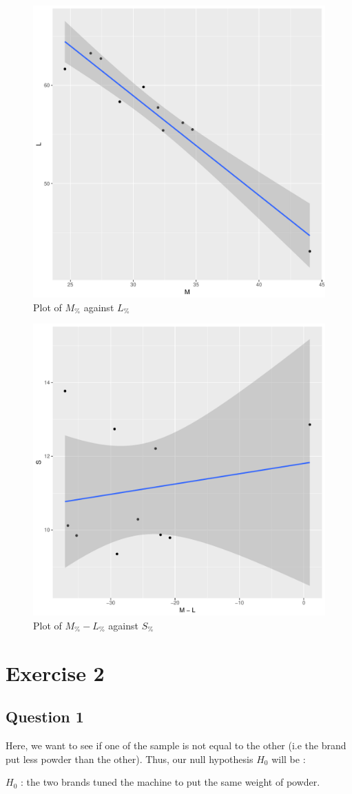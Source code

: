 \documentclass[12pt,a4paper]{article}
\begin{document}
\begin{figure}
  \begin{center}
    \includegraphics[width=0.6\linewidth]{corr1.pdf}
    \caption{Plot of $M_\%$ against $L_\%$}
    \label{corr1}
  \end{center}
\end{figure}

\begin{figure}
  \begin{center}
    \includegraphics[width=0.6\linewidth]{corr2.pdf}
    \caption{Plot of $M_\% - L_\%$ against $S_\%$}
    \label{corr2}
  \end{center}
\end{figure}

\newpage
\section*{Exercise 2}
\subsection*{Question 1}
Here, we want to see if one of the sample is not equal to the other (i.e the brand put less powder than the other). Thus, our null hypothesis $H_0$ will be :\\
\begin{center}$H_0$ : the two brands tuned the machine to put the same weight of powder.\end{center}
\end{document}
